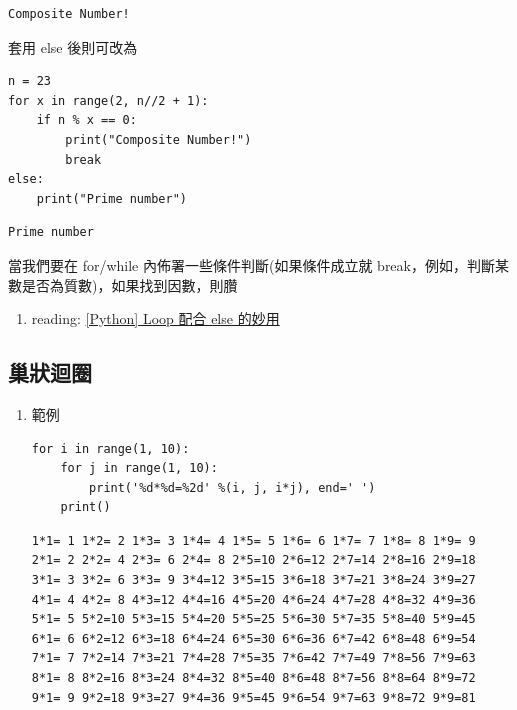 \documentclass[a4paper,12pt]{article}
\begin{document}
\begin{verbatim}
Composite Number!
\end{verbatim}


套用 else 後則可改為\\
\lstset{breaklines=true,language=Python,label= ,caption= ,captionpos=b,firstnumber=1,numbers=left}
\begin{lstlisting}
n = 23
for x in range(2, n//2 + 1):
    if n % x == 0:
        print("Composite Number!")
        break
else:
    print("Prime number")

\end{lstlisting}

\begin{verbatim}
Prime number
\end{verbatim}


當我們要在 for/while 內佈署一些條件判斷(如果條件成立就 break，例如，判斷某數是否為質數)，如果找到因數，則臢\\
\begin{enumerate}
\item reading: \href{https://note.pcwu.net/2017/02/26/python-loop-else/}{[Python] Loop 配合 else 的妙用}
\label{sec:orgc42dcb6}
\end{enumerate}

\subsection{巢狀迴圈}
\label{sec:org0dd0d1e}
\begin{enumerate}
\item 範例
\label{sec:org0e723ee}
\lstset{breaklines=true,language=Python,label= ,caption= ,captionpos=b,firstnumber=1,numbers=left}
\begin{lstlisting}
for i in range(1, 10):
    for j in range(1, 10):
        print('%d*%d=%2d' %(i, j, i*j), end=' ')
    print()

\end{lstlisting}

\begin{verbatim}
1*1= 1 1*2= 2 1*3= 3 1*4= 4 1*5= 5 1*6= 6 1*7= 7 1*8= 8 1*9= 9
2*1= 2 2*2= 4 2*3= 6 2*4= 8 2*5=10 2*6=12 2*7=14 2*8=16 2*9=18
3*1= 3 3*2= 6 3*3= 9 3*4=12 3*5=15 3*6=18 3*7=21 3*8=24 3*9=27
4*1= 4 4*2= 8 4*3=12 4*4=16 4*5=20 4*6=24 4*7=28 4*8=32 4*9=36
5*1= 5 5*2=10 5*3=15 5*4=20 5*5=25 5*6=30 5*7=35 5*8=40 5*9=45
6*1= 6 6*2=12 6*3=18 6*4=24 6*5=30 6*6=36 6*7=42 6*8=48 6*9=54
7*1= 7 7*2=14 7*3=21 7*4=28 7*5=35 7*6=42 7*7=49 7*8=56 7*9=63
8*1= 8 8*2=16 8*3=24 8*4=32 8*5=40 8*6=48 8*7=56 8*8=64 8*9=72
9*1= 9 9*2=18 9*3=27 9*4=36 9*5=45 9*6=54 9*7=63 9*8=72 9*9=81
\end{verbatim}
\end{enumerate}
\end{document}
